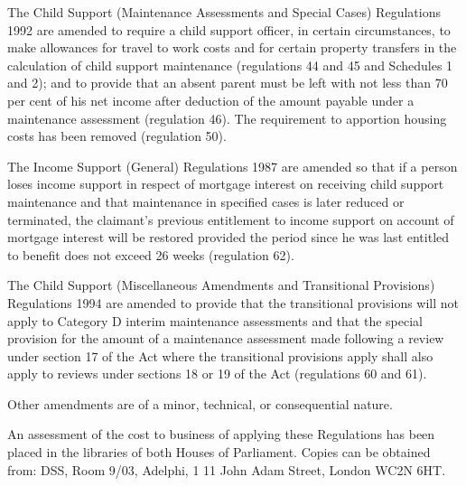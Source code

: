 \documentclass[a4paper]{article}
\begin{document}
  The Child Support (Maintenance Assessments and Special Cases) Regulations 1992 are amended to require a child support officer, in certain circumstances, to make allowances for travel to work costs and for certain property transfers in the calculation of child support maintenance (regulations 44 and 45 and Schedules 1 and 2); and to provide that an absent parent must be left with not less than 70 per cent of his net income after deduction of the amount payable under a maintenance assessment (regulation 46). The requirement to apportion housing costs has been removed (regulation 50).

  The Income Support (General) Regulations 1987 are amended so that if a person loses income support in respect of mortgage interest on receiving child support maintenance and that maintenance in specified cases is later reduced or terminated, the claimant’s previous entitlement to income support on account of mortgage interest will be restored provided the period since he was last entitled to benefit does not exceed 26 weeks (regulation 62).

  The Child Support (Miscellaneous Amendments and Transitional Provisions) Regulations 1994 are amended to provide that the transitional provisions will not apply to Category D interim maintenance assessments and that the special provision for the amount of a maintenance assessment made following a review under section 17 of the Act where the transitional provisions apply shall also apply to reviews under sections 18 or 19 of the Act (regulations 60 and 61).

  Other amendments are of a minor, technical, or consequential nature.

  An assessment of the cost to business of applying these Regulations has been placed in the libraries of both Houses of Parliament. Copies can be obtained from: DSS, Room 9/03, Adelphi, 1 11 John Adam Street, London WC2N 6HT.
\end{document}
